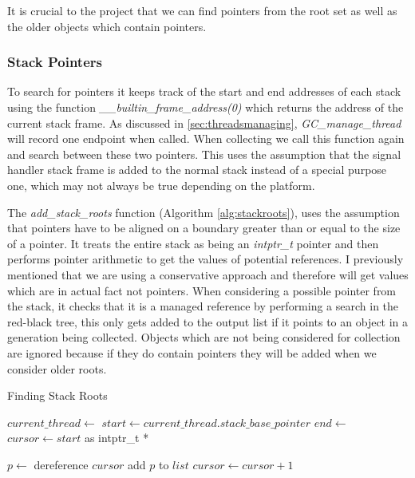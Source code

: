 \documentclass[../diss.tex]{subfiles}
\begin{document}
It is crucial to the project that we can find pointers from the root set as well as the older objects which contain pointers. 

\subsubsection{Stack Pointers}
\label{sec:stackroots}
To search for pointers it keeps track of the start and end addresses of each stack using the function \emph{\_\_builtin\_frame\_address(0)} which returns the address of the current stack frame. As discussed in \cref{sec:threadsmanaging}, \emph{GC\_manage\_thread} will record one endpoint when called. When collecting we call this function again and search between these two pointers. This uses the assumption that the signal handler stack frame is added to the normal stack instead of a special purpose one, which may not always be true depending on the platform.

The \emph{add\_stack\_roots} function (Algorithm \ref{alg:stackroots}), uses the assumption that pointers have to be aligned on a boundary greater than or equal to the size of a pointer. It treats the entire stack as being an \emph{intptr\_t} pointer and then performs pointer arithmetic to get the values of potential references. I previously mentioned that we are using a conservative approach and therefore will get values which are in actual fact not pointers. When considering a possible pointer from the stack, it checks that it is a managed reference by performing a search in the red-black tree, this only gets added to the output list if it points to an object in a generation being collected. Objects which are not being considered for collection are ignored because if they do contain pointers they will be added when we consider older roots.

\begin{algorithm}
\caption{Finding Stack Roots}
\label{alg:stackroots}
\begin{algorithmic}


\State $current\_thread\gets $ 
\State $start\gets current\_thread.stack\_base\_pointer$
\State $end\gets $ 
\State $cursor\gets start$ as intptr\_t * 

    \State $p\gets$ dereference $cursor$
            \State add $p$ to $list$
        \EndIf
    \EndIf
    \State $cursor\gets cursor+1$
\EndWhile

\EndFunction

\end{algorithmic}
\end{algorithm}
\end{document}

